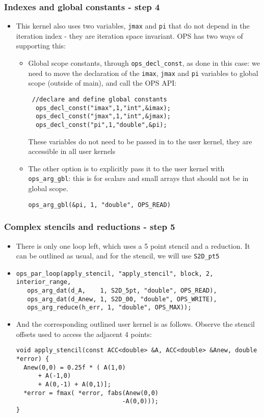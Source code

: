 \documentclass{beamer}
\begin{document}
\begin{frame}[fragile]
\frametitle{Indexes and global constants - step 4}
\begin{itemize}
\item This kernel also uses two variables, \texttt{jmax} and \texttt{pi} that do not depend in the iteration index - they are iteration space invariant. OPS has two ways of supporting this:
\begin{itemize}
\item Global scope constants, through \texttt{ops\_decl\_const}, as done in this case: we need to move the declaration of the \texttt{imax}, \texttt{jmax} and \texttt{pi} variables to global scope (outside of main), and call the OPS API:
\begin{lstlisting}
 //declare and define global constants
  ops_decl_const("imax",1,"int",&imax);
  ops_decl_const("jmax",1,"int",&jmax);
  ops_decl_const("pi",1,"double",&pi);
\end{lstlisting}  
These variables do not need to be passed in to the user kernel, they are accessible in all user kernels
\item The other option is to explicitly pass it to the user kernel with \texttt{ops\_arg\_gbl}: this is for scalars and small arrays that should not be in global scope.
\begin{lstlisting}
ops_arg_gbl(&pi, 1, "double", OPS_READ)	
\end{lstlisting}

\end{itemize}
\end{itemize}
\end{frame}

\begin{frame}[fragile]
\frametitle{Complex stencils and reductions - step 5}
\begin{itemize}
\item There is only one loop left, which uses a 5 point stencil and a reduction. It can be outlined as usual, and for the stencil, we will use \texttt{S2D\_pt5}
\item \begin{lstlisting}
ops_par_loop(apply_stencil, "apply_stencil", block, 2, interior_range,
   ops_arg_dat(d_A,    1, S2D_5pt, "double", OPS_READ),
   ops_arg_dat(d_Anew, 1, S2D_00, "double", OPS_WRITE),
   ops_arg_reduce(h_err, 1, "double", OPS_MAX));
\end{lstlisting}  
  \item And the corresponding outlined user kernel is as follows. Observe the stencil offsets used to access the adjacent 4 points:
\begin{lstlisting}
void apply_stencil(const ACC<double> &A, ACC<double> &Anew, double *error) {
  Anew(0,0) = 0.25f * ( A(1,0) 
      + A(-1,0)
      + A(0,-1) + A(0,1)];
  *error = fmax( *error, fabs(Anew(0,0)
                             -A(0,0)));
}
\end{lstlisting}  
\end{itemize}
\end{frame}
\end{document}
